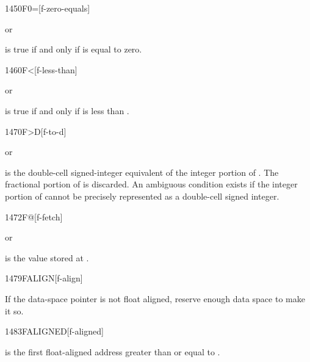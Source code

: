 \begin{worddef}{1450}{F0=}[f-zero-equals]
\item {}  or

	 is true if and only if  is equal to
	zero.
\end{worddef}


\begin{worddef}[Fless]{1460}{F<}[f-less-than]
\item {}  or

	 is true if and only if  is less than
	.
\end{worddef}


\begin{worddef}[FtoD]{1470}{F>D}[f-to-d]
\item {}  or

	 is the double-cell signed-integer equivalent of the
	integer portion of . The fractional portion of 
	is discarded. An ambiguous condition exists if the integer portion
	of  cannot be precisely represented as a double-cell
	signed integer.
\end{worddef}


\begin{worddef}{1472}{F@}[f-fetch]
\item {}  or

	 is the value stored at .
\end{worddef}


\begin{worddef}{1479}{FALIGN}[f-align]
\item \stack{}{}

	If the data-space pointer is not float aligned, reserve enough
	data space to make it so.
\end{worddef}


\begin{worddef}{1483}{FALIGNED}[f-aligned]
\item {}

	 is the first float-aligned address greater than
	or equal to .
\end{worddef}


